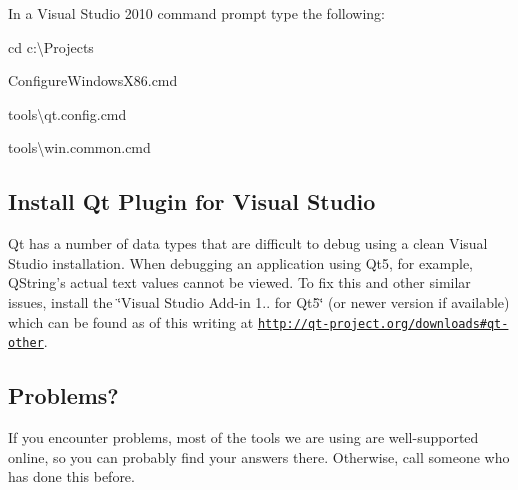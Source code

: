 \begin{DoxyEnumerate}
\item In a Visual Studio 2010 command prompt type the following\-:
\begin{DoxyEnumerate}
\item cd c\-:\textbackslash{}Projects
\item Configure\-Windows\-X86.\-cmd
\item tools\textbackslash{}qt.\-config.cmd
\item tools\textbackslash{}win.\-common.cmd
\end{DoxyEnumerate}
\end{DoxyEnumerate}\hypertarget{build_environment_preparation_install_qt_plugin}{}\subsection{Install Qt Plugin for Visual Studio}\label{build_environment_preparation_install_qt_plugin}
Qt has a number of data types that are difficult to debug using a clean Visual Studio installation. When debugging an application using Qt5, for example, Q\-String's actual text values cannot be viewed. To fix this and other similar issues, install the \char`\"{}\-Visual Studio Add-\/in 1.. for Qt5\char`\"{} (or newer version if available) which can be found as of this writing at \href{http://qt-project.org/downloads#qt-other}{\tt http\-://qt-\/project.\-org/downloads\#qt-\/other}.\hypertarget{build_environment_preparation_problems}{}\subsection{Problems?}\label{build_environment_preparation_problems}
If you encounter problems, most of the tools we are using are well-\/supported online, so you can probably find your answers there. Otherwise, call someone who has done this before. 